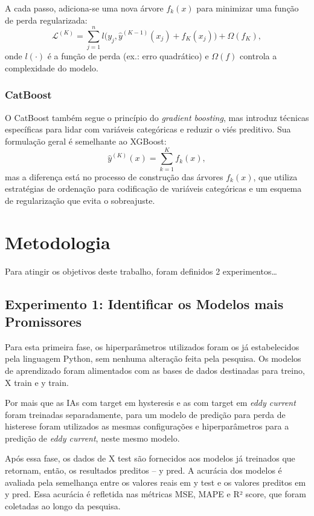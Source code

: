 \documentclass{article}
\begin{document}
A cada passo, adiciona-se uma nova árvore $f_k(x)$ para minimizar uma função de perda regularizada:
\[
\mathcal{L}^{(K)} = \sum_{j=1}^n l\big(y_j, \hat{y}^{(K-1)}(x_j) + f_K(x_j)\big) + \Omega(f_K),
\]
onde $l(\cdot)$ é a função de perda (ex.: erro quadrático) e $\Omega(f)$ controla a complexidade do modelo.



\subsubsection{CatBoost}

O CatBoost também segue o princípio do \textit{gradient boosting}, mas introduz técnicas específicas para lidar com variáveis categóricas e reduzir o viés preditivo. Sua formulação geral é semelhante ao XGBoost:
\[
\hat{y}^{(K)}(x) = \sum_{k=1}^K f_k(x),
\]
mas a diferença está no processo de construção das árvores $f_k(x)$, que utiliza estratégias de ordenação para codificação de variáveis categóricas e um esquema de regularização que evita o sobreajuste.


\newpage


\section{Metodologia}

Para atingir os objetivos deste trabalho, foram definidos 2 experimentos\dots

\subsection{Experimento 1: Identificar os Modelos mais Promissores}

Para esta primeira fase, os hiperparâmetros utilizados foram os já estabelecidos pela linguagem Python, sem nenhuma alteração feita pela pesquisa. Os modelos de aprendizado foram alimentados com as bases de dados destinadas para treino, X train e y train. 

Por mais que as IAs com target em hysteresis e as com target em \textit{eddy current} foram treinadas separadamente, para um modelo de predição para perda de histerese foram utilizados as mesmas configurações e hiperparâmetros para a predição de \textit{eddy current}, neste mesmo modelo.

Após essa fase, os dados de X test são fornecidos aos modelos já treinados que retornam, então, os resultados preditos \--- y pred. A acurácia dos modelos é avaliada pela semelhança entre os valores reais em y test e os valores preditos em y pred. Essa acurácia é refletida nas métricas MSE, MAPE e R² score, que foram coletadas ao longo da pesquisa.
\end{document}
